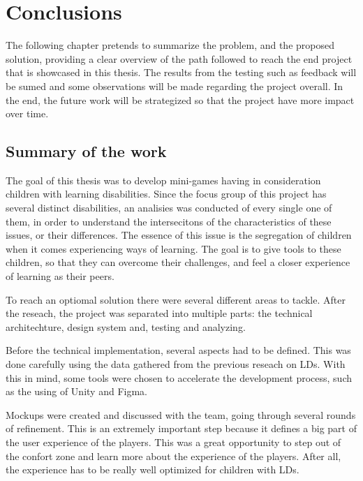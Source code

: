 \chapter{Conclusions}
\label{cha:conclusions}

The following chapter pretends to summarize the problem, and the proposed solution, providing a clear overview of the path followed to reach the end project that is showcased in this thesis.
The results from the testing such as feedback will be sumed and some observations will be made regarding the project overall.
In the end, the future work will be strategized so that the project have more impact over time.

\newpage
\section{Summary of the work}

The goal of this thesis was to develop mini-games having in consideration children with learning disabilities. Since the focus group of this project has several distinct disabilities, an analisies was conducted of every single one of them, in order to understand the intersecitons of the characteristics of these issues, or their differences. The essence of this issue is the segregation of children when it comes experiencing ways of learning. The goal is to give tools to these children, so that they can overcome their challenges, and feel a closer experience of learning as their peers.

To reach an optiomal solution there were several different areas to tackle. After the reseach, the project was separated into multiple parts: the technical architechture, design system and, testing and analyzing.

Before the technical implementation, several aspects had to be defined. This was done carefully using the data gathered from the previous reseach on LDs. With this in mind, some tools were chosen to accelerate the development process, such as the using of Unity and Figma.

Mockups were created and discussed with the team, going through several rounds of refinement. This is an extremely important step because it defines a big part of the user experience of the players. This was a great opportunity to step out of the confort zone and learn more about the experience of the players. After all, the experience has to be really well optimized for children with LDs.


